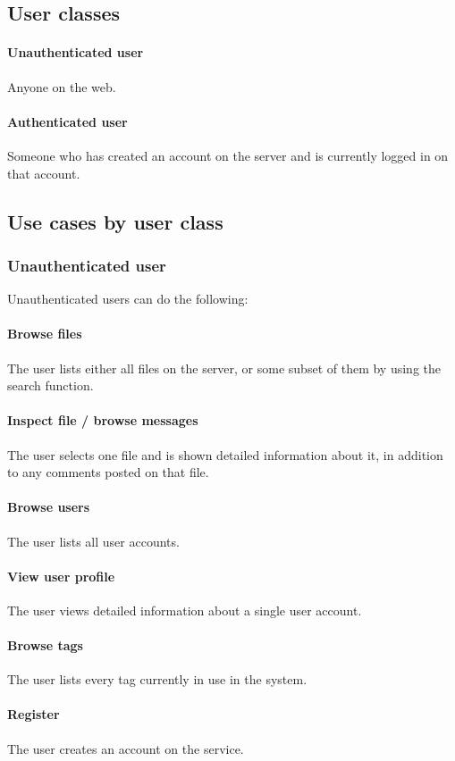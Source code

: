 \documentclass[10pt,a4paper]{article}
\begin{document}
\subsection{User classes}
\paragraph{Unauthenticated user}
Anyone on the web.

\paragraph{Authenticated user}
Someone who has created an account on the server and is currently logged in on that account.

\subsection{Use cases by user class}
\subsubsection{Unauthenticated user}
Unauthenticated users can do the following:
\paragraph{Browse files}
The user lists either all files on the server, or some subset of them by using the search function.
\paragraph{Inspect file / browse messages}
The user selects one file and is shown detailed information about it, in addition to any comments posted on that file.
\paragraph{Browse users}
The user lists all user accounts.
\paragraph{View user profile}
The user views detailed information about a single user account.
\paragraph{Browse tags}
The user lists every tag currently in use in the system.
\paragraph{Register}
The user creates an account on the service.
\end{document}
